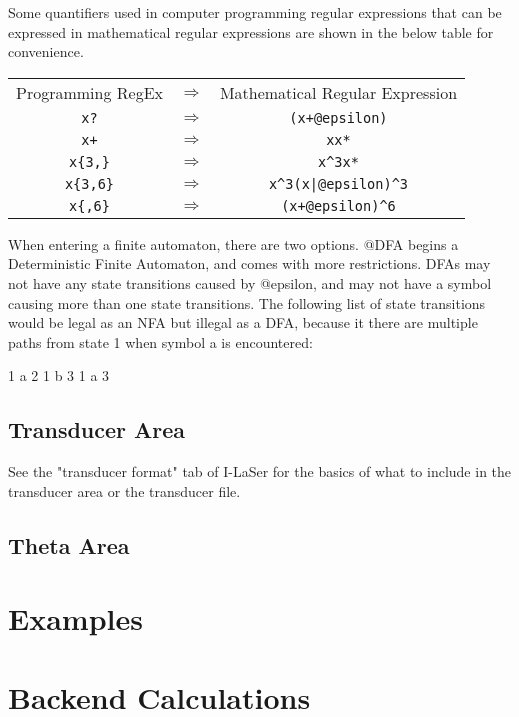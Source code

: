 \documentclass{article}
\begin{document}
\par Some quantifiers used in computer programming regular expressions that can be expressed in mathematical regular expressions are shown in the below table for convenience.
\begin{center}
\begin{tabular}{c c c}
Programming RegEx & $\Rightarrow$ & Mathematical Regular Expression \\
\verb-x?- & $\Rightarrow$ & \verb-(x+@epsilon)-\\
\verb-x+- & $\Rightarrow$ & \verb-xx*- \\
\verb-x{3,}- & $\Rightarrow$ & \verb-x^3x*- \\
\verb-x{3,6}- & $\Rightarrow$ & \verb-x^3(x|@epsilon)^3- \\
\verb-x{,6}- & $\Rightarrow$ & \verb-(x+@epsilon)^6- \\
\end{tabular}
\end{center}

When entering a finite automaton, there are two options. @DFA begins a Deterministic Finite Automaton, and comes with more restrictions. DFAs may not have any state transitions caused by @epsilon, and may not have a symbol causing more than one state transitions. The following list of state transitions would be legal as an NFA but illegal as a DFA, because it there are multiple paths from state 1 when symbol a is encountered:
\begin{center}
1 a 2
1 b 3
1 a 3
\end{center}

\subsection{Transducer Area}
See the "transducer format" tab of I-LaSer for the basics of what to include in the transducer area or the transducer file. 

\subsection{Theta Area}
\section{Examples}

\section{Backend Calculations}
\end{document}
